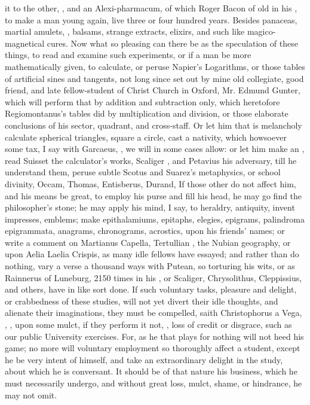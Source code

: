 {it to the other, , and an Alexi-pharmacum, of which Roger Bacon of old in his , to make a man young again, live three or four hundred years. Besides panaceas, martial amulets, , balsams, strange extracts, elixirs, and such like magico-magnetical cures. Now what so pleasing can there be as the speculation of these things, to read and examine such experiments, or if a man be more mathematically given, to calculate, or peruse Napier's Logarithms, or those tables of artificial sines and tangents, not long since set out by mine old collegiate, good friend, and late fellow-student of Christ Church in Oxford, Mr. Edmund Gunter, which will perform that by addition and subtraction only, which heretofore Regiomontanus's tables did by multiplication and division, or those elaborate conclusions of his sector, quadrant, and cross-staff. Or let him that is melancholy calculate spherical triangles, square a circle, cast a nativity, which howsoever some tax, I say with Garcaeus, , we will in some cases allow: or let him make an , read Suisset the calculator's works, Scaliger , and Petavius his adversary, till he understand them, peruse subtle Scotus and Suarez's metaphysics, or school divinity, Occam, Thomas, Entisberus, Durand, \etc{} If those other do not affect him, and his means be great, to employ his purse and fill his head, he may go find the philosopher's stone; he may apply his mind, I say, to heraldry, antiquity, invent impresses, emblems; make epithalamiums, epitaphs, elegies, epigrams, palindroma epigrammata, anagrams, chronograms, acrostics, upon his friends' names; or write a comment on Martianus Capella, Tertullian , the Nubian geography, or upon Aelia Laelia Crispis, as many idle fellows have essayed; and rather than do nothing, vary a verse a thousand ways with Putean, so torturing his wits, or as Rainnerus of Luneburg, 2150 times in his , or Scaliger, Chrysolithus, Cleppissius, and others, have in like sort done. If such voluntary tasks, pleasure and delight, or crabbedness of these studies, will not yet divert their idle thoughts, and alienate their imaginations, they must be compelled, saith Christophorus a Vega, , , upon some mulct, if they perform it not, , loss of credit or disgrace, such as our public University exercises. For, as he that plays for nothing will not heed his game; no more will voluntary employment so thoroughly affect a student, except he be very intent of himself, and take an extraordinary delight in the study, about which he is conversant. It should be of that nature his business, which  he must necessarily undergo, and without great loss, mulct, shame, or hindrance, he may not omit.

}
